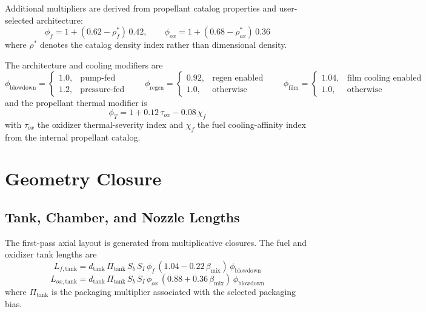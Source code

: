 \documentclass[11pt]{article}
\begin{document}
Additional multipliers are derived from propellant catalog properties and user-selected architecture:
\begin{equation}
\phi_f = 1 + (0.62-\rho_f^\ast)\,0.42,
\qquad
\phi_{ox} = 1 + (0.68-\rho_{ox}^\ast)\,0.36
\label{eq:density-terms}
\end{equation}
where $\rho^\ast$ denotes the catalog density index rather than dimensional density.

The architecture and cooling modifiers are
\begin{equation}
\phi_{\text{blowdown}}=
\begin{cases}
1.0, & \text{pump-fed}\\
1.2, & \text{pressure-fed}
\end{cases}
\qquad
\phi_{\text{regen}}=
\begin{cases}
0.92, & \text{regen enabled}\\
1.0, & \text{otherwise}
\end{cases}
\qquad
\phi_{\text{film}}=
\begin{cases}
1.04, & \text{film cooling enabled}\\
1.0, & \text{otherwise}
\end{cases}
\label{eq:architecture-modifiers}
\end{equation}
and the propellant thermal modifier is
\begin{equation}
\phi_T = 1 + 0.12\,\tau_{ox} - 0.08\,\chi_f
\label{eq:thermal-modifier}
\end{equation}
with $\tau_{ox}$ the oxidizer thermal-severity index and $\chi_f$ the fuel cooling-affinity index from the internal propellant catalog.

\section{Geometry Closure}
\subsection{Tank, Chamber, and Nozzle Lengths}
The first-pass axial layout is generated from multiplicative closures. The fuel and oxidizer tank lengths are
\begin{equation}
L_{f,\text{tank}}
=
d_{\text{tank}}\,
\Pi_{\text{tank}}\,
S_b\,
S_I\,
\phi_f\,
\left(1.04-0.22\,\beta_{\text{mix}}\right)\,
\phi_{\text{blowdown}}
\label{eq:fuel-tank-length}
\end{equation}
\begin{equation}
L_{ox,\text{tank}}
=
d_{\text{tank}}\,
\Pi_{\text{tank}}\,
S_b\,
S_I\,
\phi_{ox}\,
\left(0.88+0.36\,\beta_{\text{mix}}\right)\,
\phi_{\text{blowdown}}
\label{eq:ox-tank-length}
\end{equation}
where $\Pi_{\text{tank}}$ is the packaging multiplier associated with the selected packaging bias.
\end{document}
